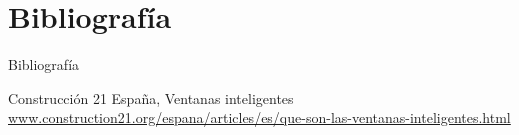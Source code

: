 \documentclass[10pt]{beamer}
\begin{document}
\section{Bibliografía}
\begin{frame}{Bibliografía}
          	\begin{thebibliography}{1}
          	
          	
          	 Construcción 21 España, Ventanas inteligentes 
          	 \textcolor{blue}{\url{www.construction21.org/espana/articles/es/que-son-las-ventanas-inteligentes.html}}
          	
          \end{thebibliography}
\end{frame}
\end{document}
